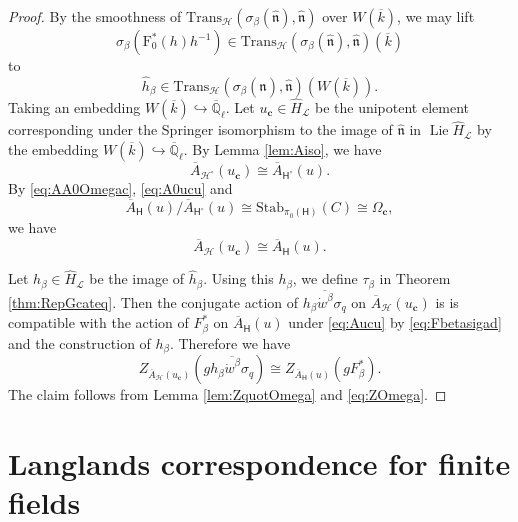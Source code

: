 \documentclass[12pt,a4paper]{article}
\DeclareMathOperator{\Lie}{Lie}
\newcommand{\mb}{\mathbb}
\newcommand{\mc}{\mathcal}
\newcommand{\mr}{\mathrm}
\newcommand{\mf}{\mathfrak}
\newcommand{\mbf}{\mathbf}
\newcommand{\ms}{\mathsf}
\newcommand{\msc}{\mathscr}
\newcommand{\ol}{\overline}
\newcommand{\wh}{\widehat}
\begin{document}
\begin{proof}
By the smoothness of $\mr{Trans}_{\msc{H}}(\sigma_{\beta}(\wh{\mf{n}}), \wh{\mf{n}}) $ over $W(\ol{k})$, we may lift 
\begin{equation*}
\sigma_{\beta}(\mr{F}_{0}^*(h)h^{-1}) \in \mr{Trans}_{\msc{H}}(\sigma_{\beta}(\wh{\mf{n}}), \wh{\mf{n}})(\ol{k})
\end{equation*}
to 
\begin{equation*}
\wh{h}_{\beta} \in \mr{Trans}_{\msc{H}}(\sigma_{\beta}(\wh{\mf{n}}), \wh{\mf{n}})(W(\ol{k})). 
\end{equation*}
Taking an embedding $W(\ol{k}) \hookrightarrow \ol{\mb{Q}}_{\ell}$. 
Let $u_{\mbf{c}} \in \wh{H}_{\mc{L}}$ be the unipotent element corresponding under the Springer isomorphism to the image of $\wh{\mf{n}}$ in $\Lie \wh{H}_{\mc{L}}$ by the embedding $W(\ol{k}) \hookrightarrow \ol{\mb{Q}}_{\ell}$. 
By Lemma \ref{lem:Aiso}, we have 
\begin{equation}\label{eq:A0ucu}
 \ol{A}_{\mc{H}^{\circ}} (u_{\mbf{c}}) \cong 
 \ol{A}_{\ms{H}^{\circ}} (u). 
\end{equation}
By \eqref{eq:AA0Omegac}, \eqref{eq:A0ucu} and 
\begin{equation*}
 \ol{A}_{\ms{H}}(u) / \ol{A}_{\ms{H}^{\circ}}(u) \cong \mathrm{Stab}_{\pi_0 (\ms{H})}(C) \cong \Omega_{\mbf{c}} ,  
\end{equation*}
we have 
\begin{equation}\label{eq:Aucu}
	\ol{A}_{\mc{H}} (u_{\mbf{c}}) \cong 
	\ol{A}_{\ms{H}} (u). 
\end{equation}

Let $h_{\beta} \in \wh{H}_{\mc{L}}$ be the image of $\wh{h}_{\beta}$. 
Using this $h_{\beta}$, we define $\tau_{\beta}$ in Theorem \ref{thm:RepGcateq}. 
Then the conjugate action of $\ol{h_{\beta} \dot{w}^{\beta} \sigma_q}$ on $\ol{A}_{\mc{H}} (u_{\mbf{c}})$ is 
is compatible with 
the action of $F_{\beta}^*$ on $\ol{A}_{\ms{H}}(u)$ 
under \eqref{eq:Aucu} 
by \eqref{eq:Fbetasigad} and the construction of $h_{\beta}$. 
Therefore we have 
\begin{equation}\label{eq:ZOmega}
		Z_{\ol{A}_{\mc{H}}(u_{\mbf{c}})}(g \ol{h_{\beta} \dot{w}^{\beta} \sigma_q})  \cong 
	Z_{\ol{A}_{\ms{H}}(u)}(g F_{\beta}^*).  
\end{equation}
The claim follows from Lemma \ref{lem:ZquotOmega} and \eqref{eq:ZOmega}. 
\end{proof}

\section{Langlands correspondence for finite fields}
\end{document}
